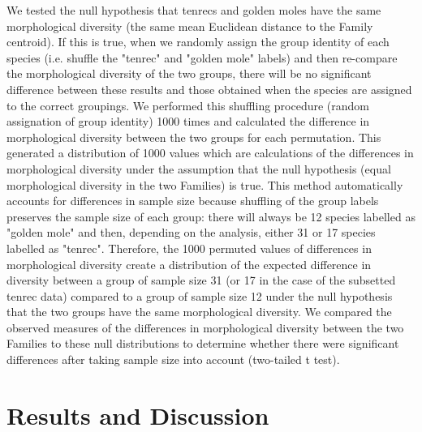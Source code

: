 \documentclass[12pt,a4paper]{article}
\begin{document}
	We tested the null hypothesis that tenrecs and golden moles have the same morphological diversity (the same mean Euclidean distance to the Family centroid). If this is true, when we randomly assign the group identity of each species (i.e. shuffle the "tenrec" and "golden mole" labels) and then re-compare the morphological diversity of the two groups, there will be no significant difference between these results and those obtained when the species are assigned to the correct groupings. 
	We performed this shuffling procedure (random assignation of group identity) 1000 times and calculated the difference in morphological diversity between the two groups for each permutation. This generated a distribution of 1000 values which are calculations of the differences in morphological diversity under the assumption that the null hypothesis (equal morphological diversity in the two Families) is true. This method automatically accounts for differences in sample size because shuffling of the group labels preserves the sample size of each group: there will always be 12 species labelled as "golden mole" and then, depending on the analysis, either 31 or 17 species labelled as "tenrec". Therefore, the 1000 permuted values of differences in morphological diversity create a distribution of the expected difference in diversity between a group of sample size 31 (or 17 in the case of the subsetted tenrec data) compared to a group of sample size 12 under the null hypothesis that the two groups have the same morphological diversity. We compared the observed measures of the differences in morphological diversity between the two Families to these null distributions to determine whether there were significant differences after taking sample size into account (two-tailed t test).
\section{Results and Discussion} %
\end{document}

